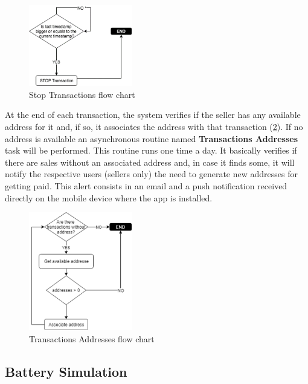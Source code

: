\begin{figure}[h]
\centering
\includegraphics[width=0.4\textwidth]{./Images/ps15}
\caption{Stop Transactions flow chart}
\label{fig:ps15}
\end{figure}


At the end of each transaction, the system verifies if the seller has any available address for it and, if so, it associates the address with that transaction (\cref{fig:ps16}). If no address is available an asynchronous routine named \textbf{Transactions Addresses} task will be performed. This routine runs one time a day. It basically verifies if there are sales without an associated address and, in case it finds some, it will notify the respective users (sellers only) the need to generate new addresses for getting paid. This alert consists in an email and a push notification received directly on the mobile device where the app is installed.  



\begin{figure}[h]
\centering
\includegraphics[width=0.4\textwidth]{./Images/ps16}
\caption{Transactions Addresses flow chart}
\label{fig:ps16}
\end{figure}

\subsection{Battery Simulation}


